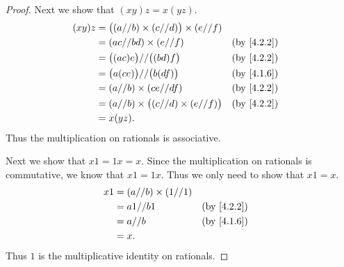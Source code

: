 \begin{proof}
  Next we show that \((xy)z = x(yz)\).
  \begin{align*}
    (xy)z & = \big((a // b) \times (c // d)\big) \times (e // f)                               \\
          & = (ac // bd) \times (e // f)                         &  & \text{(by \cref{4.2.2})} \\
          & = \big((ac)e\big) // \big((bd)f\big)                 &  & \text{(by \cref{4.2.2})} \\
          & = \big(a(ce)\big) // \big(b(df)\big)                 &  & \text{(by \cref{4.1.6})} \\
          & = (a // b) \times (ce // df)                         &  & \text{(by \cref{4.2.2})} \\
          & = (a // b) \times \big((c // d) \times (e // f)\big) &  & \text{(by \cref{4.2.2})} \\
          & = x(yz).
  \end{align*}
  Thus the multiplication on rationals is associative.

  Next we show that \(x1 = 1x = x\).
  Since the multiplication on rationals is commutative, we know that \(x1 = 1x\).
  Thus we only need to show that \(x1 = x\).
  \begin{align*}
    x1 & = (a // b) \times (1 // 1)                               \\
       & = a1 // b1                 &  & \text{(by \cref{4.2.2})} \\
       & = a // b                   &  & \text{(by \cref{4.1.6})} \\
       & = x.
  \end{align*}
  Thus \(1\) is the multiplicative identity on rationals.


\end{proof}
